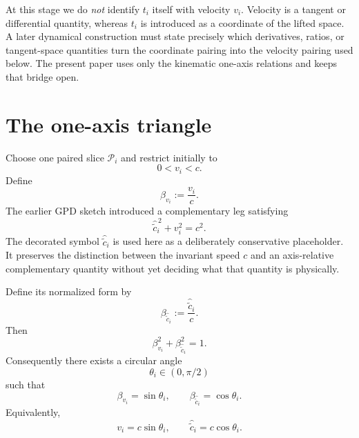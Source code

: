 \documentclass[11pt]{article}
\newcommand{\ccomp}[1]{\widehat{\widetilde{c}}_{#1}}
\begin{document}
At this stage we do \emph{not} identify $t_i$ itself with velocity $v_i$.
Velocity is a tangent or differential quantity, whereas $t_i$ is introduced
as a coordinate of the lifted space. A later dynamical construction must
state precisely which derivatives, ratios, or tangent-space quantities turn
the coordinate pairing into the velocity pairing used below. The present
paper uses only the kinematic one-axis relations and keeps that bridge open.

\section{The one-axis triangle}

Choose one paired slice $\mathcal{P}_i$ and restrict initially to
\begin{equation}
0<v_i<c.
\end{equation}
Define
\begin{equation}
\beta_{v_i}:=\frac{v_i}{c}.
\label{eq:betavi}
\end{equation}
The earlier GPD sketch introduced a complementary leg satisfying
\begin{equation}
\ccomp{i}^{\,2}+v_i^2=c^2.
\label{eq:complement-dimensional}
\end{equation}
The decorated symbol $\ccomp{i}$ is used here as a deliberately conservative
placeholder. It preserves the distinction between the invariant speed $c$
and an axis-relative complementary quantity without yet deciding what that
quantity is physically.

Define its normalized form by
\begin{equation}
\beta_{\ccomp{i}}
:=
\frac{\ccomp{i}}{c}.
\label{eq:betaci}
\end{equation}
Then
\begin{equation}
\beta_{v_i}^2+\beta_{\ccomp{i}}^2=1.
\label{eq:axis-unit-circle}
\end{equation}
Consequently there exists a circular angle
\begin{equation}
\theta_i\in(0,\pi/2)
\end{equation}
such that
\begin{equation}
\beta_{v_i}=\sin\theta_i,
\qquad
\beta_{\ccomp{i}}=\cos\theta_i.
\label{eq:axis-circular}
\end{equation}
Equivalently,
\begin{equation}
v_i=c\sin\theta_i,
\qquad
\ccomp{i}=c\cos\theta_i.
\label{eq:axis-dimensional}
\end{equation}
\end{document}
